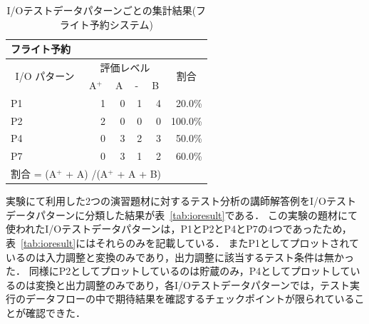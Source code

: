 \begin{table}[htbp]
  \centering
  \caption{I/Oテストデータパターンごとの集計結果(フライト予約システム)}
    \begin{tabular}{lllllr}
    フライト予約 &       &       &       &       &  \bigstrut[b]\\
    \hline
    \multicolumn{1}{|c|}{\multirow{2}[4]{*}{I/O パターン}} & \multicolumn{4}{c|}{評価レベル}    & \multicolumn{1}{c|}{\multirow{2}[4]{*}{割合}} \bigstrut\\
\cline{2-5}    \multicolumn{1}{|c|}{} & \multicolumn{1}{l|}{A${}^\text{+}$} & \multicolumn{1}{l|}{A} & \multicolumn{1}{l|}{-} & \multicolumn{1}{l|}{B} & \multicolumn{1}{c|}{} \bigstrut\\
    \hline
    \hline
    \multicolumn{1}{|l|}{P1} & \multicolumn{1}{r|}{1} & \multicolumn{1}{r|}{0} & \multicolumn{1}{r|}{1} & \multicolumn{1}{r|}{4} & \multicolumn{1}{r|}{20.0\%} \bigstrut\\
    \hline
    \multicolumn{1}{|l|}{P2} & \multicolumn{1}{r|}{2} & \multicolumn{1}{r|}{0} & \multicolumn{1}{r|}{0} & \multicolumn{1}{r|}{0} & \multicolumn{1}{r|}{100.0\%} \bigstrut\\
    \hline
    \multicolumn{1}{|l|}{P4} & \multicolumn{1}{r|}{0} & \multicolumn{1}{r|}{3} & \multicolumn{1}{r|}{2} & \multicolumn{1}{r|}{3} & \multicolumn{1}{r|}{50.0\%} \bigstrut\\
    \hline
    \multicolumn{1}{|l|}{P7} & \multicolumn{1}{r|}{0} & \multicolumn{1}{r|}{3} & \multicolumn{1}{r|}{1} & \multicolumn{1}{r|}{2} & \multicolumn{1}{r|}{60.0\%} \bigstrut\\
    \hline
    \multicolumn{5}{l}{割合 = (A${}^\text{+}$  +  A) /(A${}^\text{+}$  +  A + B) } &  \bigstrut[t]\\
    \end{tabular}%
\label{tab:D-4-tab20}%
\end{table}%


実験にて利用した2つの演習題材に対するテスト分析の講師解答例をI/Oテストデータパターンに分類した結果が表~\ref{tab:ioresult}である．
この実験の題材にて使われたI/Oテストデータパターンは，P1とP2とP4とP7の4つであったため，表~\ref{tab:ioresult}にはそれらのみを記載している．
またP1としてプロットされているのは入力調整と変換のみであり，出力調整に該当するテスト条件は無かった．
同様にP2としてプロットしているのは貯蔵のみ，P4としてプロットしているのは変換と出力調整のみであり，各I/Oテストデータパターンでは，テスト実行のデータフローの中で期待結果を確認するチェックポイントが限られていることが確認できた．

